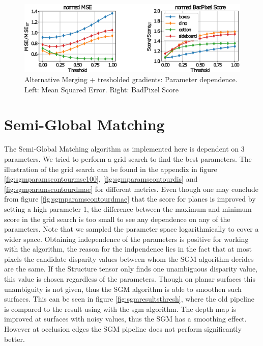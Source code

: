 \documentclass  [
  paper    = a4,
  BCOR     = 10mm,
  twoside,
  fontsize = 12pt,
  fleqn,
  toc      = bibnumbered,
  toc      = listofnumbered,
  numbers  = noendperiod,
  headings = normal,
  listof   = leveldown,
  version  = 3.03
]                                       {scrreprt}
\begin{document}
\begin{figure}
	\centering
	\includegraphics[width=1\linewidth]{images/choose_lower_params_thresh}
	\caption[Alternative Merging: Parameter dependence]{Alternative Merging + tresholded gradients: Parameter dependence. Left: Mean Squared Error. Right: BadPixel Score}
	\label{fig:chooselowerparamsthresh}
\end{figure}






\section{Semi-Global Matching}
The Semi-Global Matching algorithm as implemented here is dependent on 3 parameters. We tried to perform a grid search to find the best parameters. The illustration of the grid search can be found in the appendix in figure \ref{fig:sgmparamscontourmse100}, \ref{fig:sgmparamscontourdis} and \ref{fig:sgmparamscontourdmae} for different metrics. Even though one may conclude from  figure \ref{fig:sgmparamscontourdmae} that the score for planes is improved by setting a high parameter 1, the difference between the maximum and minimum score in the grid search is too small to see any dependence on any of the parameters. Note that we sampled the parameter space logarithmically to cover a wider space. Obtaining independence of the parameters is positive for working with the algorithm, the reason for the indpendence lies in the fact that at most pixels the candidate disparity values between whom the SGM algorithm decides are the same. If the Structure tensor only finds one unambiguous disparity value, this value is chosen regardless of the parameters. Though on planar surfaces this unambiguity is not given, thus the SGM algorithm is able to smoothen such surfaces. This can be seen in figure \ref{fig:sgmresultsthresh}, where the old pipeline is compared to the result using with the sgm algorithm. The depth map is improved at surfaces with noisy values, thus the SGM has a smoothing effect. However at occlusion edges the SGM pipeline does not perform significantly better. 
\end{document}
